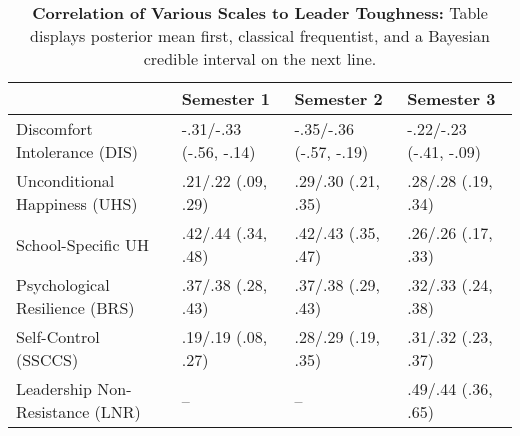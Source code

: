 \begin{table}[ht]
\centering
\begin{tabular}{llll}
  \hline
 & Semester 1 & Semester 2 & Semester 3 \\ 
  \hline
Discomfort Intolerance (DIS) & -.31/-.33 (-.56, -.14) & -.35/-.36 (-.57, -.19) & -.22/-.23 (-.41, -.09) \\ 
  Unconditional Happiness (UHS) & .21/.22 (.09, .29) & .29/.30 (.21, .35) & .28/.28 (.19, .34) \\ 
  School-Specific UH & .42/.44 (.34, .48) & .42/.43 (.35, .47) & .26/.26 (.17, .33) \\ 
  Psychological Resilience (BRS) & .37/.38 (.28, .43) & .37/.38 (.29, .43) & .32/.33 (.24, .38) \\ 
  Self-Control (SSCCS) & .19/.19 (.08, .27) & .28/.29 (.19, .35) & .31/.32 (.23, .37) \\ 
  Leadership Non-Resistance (LNR) & -- & -- & .49/.44 (.36, .65) \\ 
   \hline
\end{tabular}
\caption{\textbf{Correlation of Various Scales to Leader Toughness:} Table displays posterior mean first, classical frequentist, and a Bayesian credible interval on the next line.} 
\label{tab:edc_corr}
\end{table}
